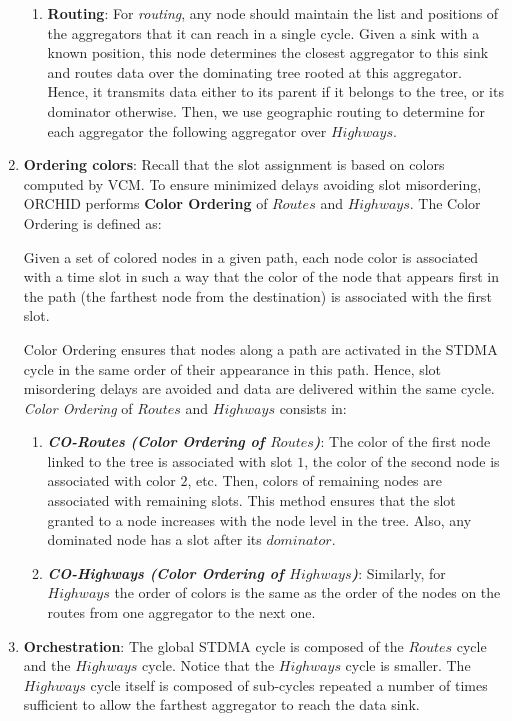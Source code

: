 \begin{enumerate}
\begin{enumerate}
\item \textbf{Routing}: 
For \textit{routing}, any node should maintain the list and positions of the aggregators that it can reach in a single cycle. Given a sink with a known position, this node determines the closest aggregator to this sink and routes data over the dominating tree rooted at this aggregator. Hence, it transmits data either to its parent if it belongs to the tree, or its dominator otherwise.
Then, we use geographic routing to determine for each aggregator the following aggregator over $Highways$.
\end{enumerate}
\item \textbf{Ordering colors}:
Recall that the slot assignment is based on colors computed by VCM. To ensure minimized delays avoiding slot misordering, ORCHID performs \textbf{Color Ordering} of $Routes$ and $Highways$. The Color Ordering is defined as:
\begin{definition}
Given a set of colored nodes in a given path, each node color is associated with a time slot in such a way that the color of the node that appears first in the path (the farthest node from the destination) is associated with the first slot. 
\end{definition}
Color Ordering ensures that nodes along a path are activated in the STDMA cycle in the same order of their appearance in this path. Hence, slot misordering delays are avoided and data are delivered within the same cycle.
\textit{Color Ordering} of $Routes$ and $Highways$ consists in:
\begin{enumerate}
\item \textbf{\textit{CO-Routes (Color Ordering of $Routes$)}}: 
The color of the first node linked to the tree is associated with slot $1$, the color of the second node is associated with color $2$, etc. Then, colors of remaining nodes are associated with remaining slots.
This method ensures that the slot granted to a node increases with the node level in the tree. Also, any dominated node has a slot after its $dominator$.


\item \textbf{\textit{CO-Highways (Color Ordering of $Highways$)}}: Similarly, for $Highways$ the order of colors is the same as the order of the nodes on the routes from one aggregator to the next one. 
\end{enumerate}

\item \textbf{Orchestration}:
The global STDMA cycle is composed of the $Routes$ cycle and the $Highways$ cycle. Notice that the $Highways$ cycle is smaller. The $Highways$ cycle itself is composed of sub-cycles repeated a number of times sufficient to allow the farthest aggregator to reach the data sink.

\end{enumerate}



